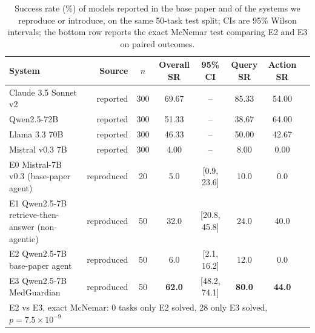 \documentclass[conference]{IEEEtran}
\begin{document}
\begin{table}[t]
\centering
\small
\caption{Success rate (\%) of models reported in the base paper and of the systems we reproduce or introduce, on the same 50-task test split; CIs are 95\% Wilson intervals; the bottom row reports the exact McNemar test comparing E2 and E3 on paired outcomes.}
\label{tab:main_results}
\begin{tabular}{lrcccccc}
\toprule
\textbf{System} & \textbf{Source} & $n$ & \textbf{Overall SR} & \textbf{95\% CI} & \textbf{Query SR} & \textbf{Action SR} \\
\midrule
Claude 3.5 Sonnet v2 & reported & 300 & 69.67 & -- & 85.33 & 54.00 \\
Qwen2.5-72B & reported & 300 & 51.33 & -- & 38.67 & 64.00 \\
Llama 3.3 70B & reported & 300 & 46.33 & -- & 50.00 & 42.67 \\
Mistral v0.3 7B & reported & 300 & 4.00 & -- & 8.00 & 0.00 \\
\midrule
E0 Mistral-7B v0.3 (base-paper agent) & reproduced & 20 & 5.0 & [0.9, 23.6] & 10.0 & 0.0 \\
E1 Qwen2.5-7B retrieve-then-answer (non-agentic) & reproduced & 50 & 32.0 & [20.8, 45.8] & 24.0 & 40.0 \\
E2 Qwen2.5-7B base-paper agent & reproduced & 50 & 6.0 & [2.1, 16.2] & 12.0 & 0.0 \\
E3 Qwen2.5-7B MedGuardian & reproduced & 50 & \textbf{62.0} & [48.2, 74.1] & \textbf{80.0} & \textbf{44.0} \\
\bottomrule
\multicolumn{7}{l}{E2 vs E3, exact McNemar: 0 tasks only E2 solved, 28 only E3 solved, $p=7.5\times10^{-9}$} \\
\end{tabular}
\end{table}
\end{document}
